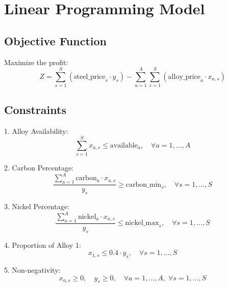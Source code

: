 \documentclass{article}
\begin{document}
\section*{Linear Programming Model}

\subsection*{Objective Function}
Maximize the profit:
\begin{equation}
Z = \sum_{s=1}^{S} \left( \text{steel\_price}_s \cdot y_s \right) - \sum_{a=1}^{A} \sum_{s=1}^{S} \left( \text{alloy\_price}_a \cdot x_{a,s} \right)
\end{equation}

\subsection*{Constraints}

1. Alloy Availability:
\begin{equation}
\sum_{s=1}^{S} x_{a,s} \leq \text{available}_a, \quad \forall a = 1, \ldots, A
\end{equation}

2. Carbon Percentage:
\begin{equation}
\frac{\sum_{a=1}^{A} \text{carbon}_a \cdot x_{a,s}}{y_s} \geq \text{carbon\_min}_s, \quad \forall s = 1, \ldots, S
\end{equation}

3. Nickel Percentage:
\begin{equation}
\frac{\sum_{a=1}^{A} \text{nickel}_a \cdot x_{a,s}}{y_s} \leq \text{nickel\_max}_s, \quad \forall s = 1, \ldots, S
\end{equation}

4. Proportion of Alloy 1:
\begin{equation}
x_{1,s} \leq 0.4 \cdot y_s, \quad \forall s = 1, \ldots, S
\end{equation}

5. Non-negativity:
\begin{equation}
x_{a,s} \geq 0, \quad y_s \geq 0, \quad \forall a = 1, \ldots, A, \; \forall s = 1, \ldots, S
\end{equation}
\end{document}

